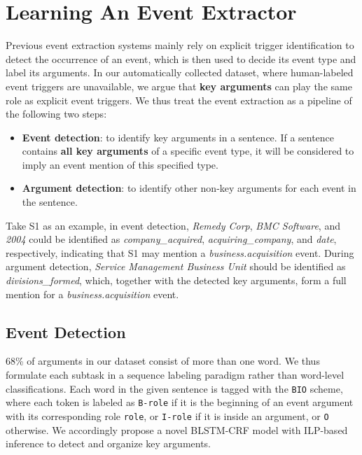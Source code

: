 \section{Learning An Event Extractor}
Previous event extraction systems mainly rely on explicit trigger identification to detect the occurrence of an event,
which is then used to decide its event type and label its arguments.
In our automatically collected dataset, where human-labeled event triggers are unavailable, we argue that \textbf{key arguments} can play the same role as explicit event triggers.
We thus treat the event extraction as a pipeline of the following two steps:
\begin{itemize}
	\item \textbf{Event detection}: to identify key arguments in a sentence. If a sentence contains \textbf{all key arguments} of a specific event type, it will be considered to imply an event mention of this specified type.
	\item \textbf{Argument detection}: to identify other non-key arguments for each event in the sentence.
\end{itemize}
%
Take S1 as an example, in event detection, \emph{Remedy Corp}, \emph{BMC Software}, and \emph{2004} could be identified as \emph{company\_acquired}, \emph{acquiring\_company}, and \emph{date}, respectively, indicating that S1 may mention a \emph{business.acquisition} event.
During argument detection, \emph{Service Management Business Unit} should be identified as \emph{divisions\_formed},
which, together with the detected key arguments, form a full mention for a \emph{business.acquisition} event.

\subsection{Event Detection \label{evede}}

68\%  of  arguments in our dataset consist of more than one word. We thus formulate each subtask in a sequence labeling paradigm rather than word-level classifications. Each word in the given sentence is tagged with the \texttt{BIO} scheme, where each token is labeled as \texttt{B-role} if it is the beginning of an event argument with its corresponding role \texttt{role}, or \texttt{I-role} if it is inside an argument, or \texttt{O} otherwise.  We accordingly propose a novel BLSTM-CRF model with ILP-based inference to detect and organize key arguments.

